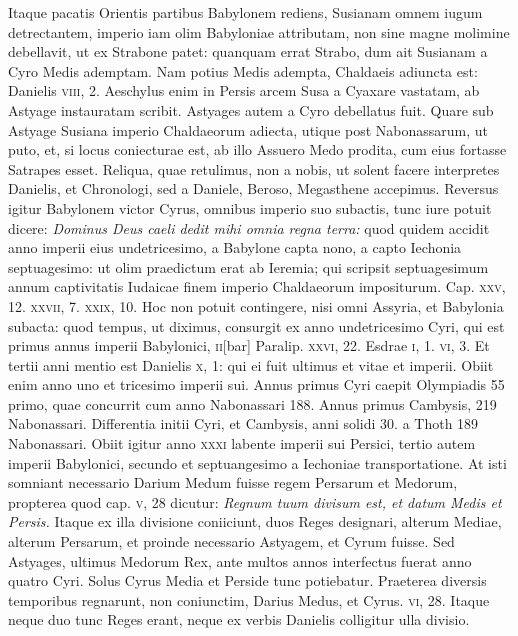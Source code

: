 Itaque pacatis Orientis partibus Babylonem rediens, Susianam omnem iugum
detrectantem, imperio iam olim Babyloniae attributam, non
sine magne molimine debellavit, ut ex Strabone patet: quanquam
errat Strabo, dum ait Susianam a Cyro Medis ademptam.
Nam
potius Medis adempta, Chaldaeis adiuncta est: Danielis \textsc{viii}, 2.
Aeschylus enim in Persis arcem Susa a Cyaxare vastatam, ab Astyage
instauratam scribit.
Astyages autem a Cyro debellatus fuit.
Quare sub Astyage Susiana imperio Chaldaeorum adiecta, utique
post Nabonassarum, ut puto, et, si locus coniecturae est, ab illo
Assuero Medo prodita, cum eius fortasse Satrapes esset.
Reliqua,
quae retulimus, non a nobis, ut solent facere interpretes Danielis,
et Chronologi, sed a Daniele, Beroso, Megasthene accepimus.
Reversus igitur Babylonem victor Cyrus, omnibus imperio suo
subactis, tunc iure potuit dicere: \textit{Dominus Deus caeli dedit mihi omnia
regna terra:} quod quidem accidit anno imperii eius undetricesimo,
a Babylone capta nono, a capto Iechonia septuagesimo: ut
olim praedictum erat ab Ieremia; qui scripsit septuagesimum annum
captivitatis Iudaicae finem imperio Chaldaeorum impositurum.
Cap. \textsc{xxv}, 12. \textsc{xxvii}, 7. \textsc{xxix}, 10.
Hoc non potuit contingere,
nisi omni Assyria, et Babylonia subacta: quod tempus,
ut diximus, consurgit ex anno undetricesimo Cyri, qui est primus
annus imperii Babylonici, \textsc{ii}[bar] Paralip. \textsc{xxvi}, 22.
Esdrae \textsc{i}, 1.
\textsc{vi}, 3.
Et tertii anni mentio est Danielis \textsc{x}, 1: qui ei fuit
 ultimus et
vitae et imperii.
Obiit enim anno uno et tricesimo imperii sui.
Annus primus Cyri caepit Olympiadis 55 primo, quae concurrit cum
anno Nabonassari 188.
Annus primus Cambysis, 219 Nabonassari.
Differentia initii Cyri, et Cambysis, anni solidi 30. a Thoth
189 Nabonassari.
Obiit igitur anno \textsc{xxxi} labente imperii sui Persici,
tertio autem imperii Babylonici, secundo et septuangesimo a
Iechoniae transportatione.
At isti somniant necessario Darium Medum
fuisse regem Persarum et Medorum, propterea quod cap. \textsc{v},
28 dicutur: \textit{Regnum tuum divisum est, et datum Medis et Persis.}
Itaque ex illa divisione coniiciunt, duos Reges designari, alterum
Mediae, alterum Persarum, et proinde necessario Astyagem, et
Cyrum fuisse.
Sed Astyages, ultimus Medorum Rex, ante multos
annos interfectus fuerat anno quatro Cyri.
Solus Cyrus Media et
Perside tunc potiebatur.
Praeterea diversis temporibus regnarunt,
non coniunctim, Darius Medus, et Cyrus. \textsc{vi}, 28.
{}
Itaque neque
duo tunc Reges erant, neque ex verbis Danielis colligitur ulla divisio.

